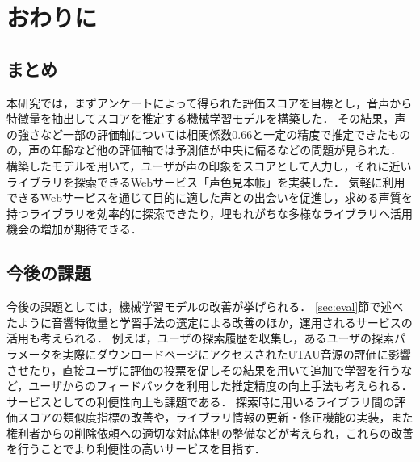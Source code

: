 \chapter{おわりに}
\thispagestyle{myheadings}

\section{まとめ}
本研究では，まずアンケートによって得られた評価スコアを目標とし，音声から特徴量を抽出してスコアを推定する機械学習モデルを構築した．
その結果，声の強さなど一部の評価軸については相関係数0.66と一定の精度で推定できたものの，声の年齢など他の評価軸では予測値が中央に偏るなどの問題が見られた．
構築したモデルを用いて，ユーザが声の印象をスコアとして入力し，それに近いライブラリを探索できるWebサービス「声色見本帳」を実装した．
気軽に利用できるWebサービスを通じて目的に適した声との出会いを促進し，求める声質を持つライブラリを効率的に探索できたり，埋もれがちな多様なライブラリへ活用機会の増加が期待できる．

\section{今後の課題}
今後の課題としては，機械学習モデルの改善が挙げられる．
\ref{sec:eval}節で述べたように音響特徴量と学習手法の選定による改善のほか，運用されるサービスの活用も考えられる．
例えば，ユーザの探索履歴を収集し，あるユーザの探索パラメータを実際にダウンロードページにアクセスされたUTAU音源の評価に影響させたり，直接ユーザに評価の投票を促しその結果を用いて追加で学習を行うなど，ユーザからのフィードバックを利用した推定精度の向上手法も考えられる．
サービスとしての利便性向上も課題である．
探索時に用いるライブラリ間の評価スコアの類似度指標の改善や，ライブラリ情報の更新・修正機能の実装，また権利者からの削除依頼への適切な対応体制の整備などが考えられ，これらの改善を行うことでより利便性の高いサービスを目指す．

